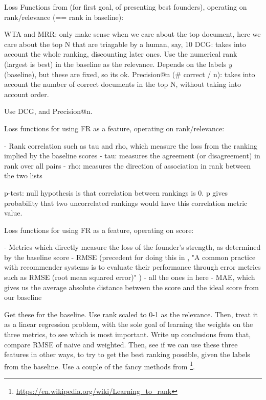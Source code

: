 Loss Functions from \cite{DBLP:journals/corr/abs-0704-3359} (for first goal, of presenting best founders), operating on rank/relevance (== rank in baseline):

WTA and MRR: only make sense when we care about the top document, here we care about the top N that are triagable by a human, say, 10
DCG: takes into account the whole ranking, discounting later ones. Use the numerical rank (largest is best) in the baseline as the relevance. Depends on the labels $y$ (baseline), but these are fixed, so its ok.
Precision@n (\# correct / n): takes into account the number of correct documents in the top N, without taking into account order.

Use DCG, and Precision@n.

Loss functions for using FR as a feature, operating on rank/relevance:

- Rank correlation such as tau and rho, which measure the loss from the ranking implied by the baseline scores
  - tau: measures the agreement (or disagreement) in rank over all pairs
  - rho: measures the direction of association in rank between the two lists

p-test: null hypothesis is that correlation between rankings is 0. p gives probability that two uncorrelated rankings would have this correlation metric value.

Loss functions for using FR as a feature, operating on score:

- Metrics which directly measure the loss of the founder's strength, as determined by the baseline score
  - RMSE (precedent for doing this in \cite{said2014comparative}, "A common practice with recommender systems is to evaluate their performance through error metrics such as RMSE (root mean squared error)" \cite{Cremonesi:2010:PRA:1864708.1864721})
  - all the ones in here \cite{Gunawardana:2009:SAE:1577069.1755883}
  - MAE, which gives us the average absolute distance between the score and the ideal score from our baseline

Get these for the baseline. Use rank scaled to 0-1 as the relevance.
Then, treat it as a linear regression problem, with the sole goal of learning the weights on the three metrics, to see which is most important. Write up conclusions from that, compare RMSE of naive and weighted.
Then, see if we can use these three features in other ways, to try to get the best ranking possible, given the labels from the baseline. Use a couple of the fancy methods from \footnote{\url{https://en.wikipedia.org/wiki/Learning_to_rank}}.


